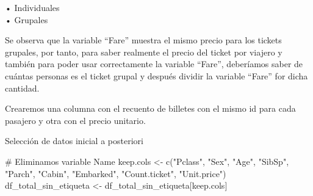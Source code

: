 \documentclass[
]{article}
\newenvironment{Shaded}{\begin{snugshade}}{\end{snugshade}}
\newcommand{\CommentTok}[1]{\textcolor[rgb]{0.50,0.62,0.50}{#1}}
\newcommand{\DataTypeTok}[1]{\textcolor[rgb]{0.87,0.87,0.75}{#1}}
\newcommand{\KeywordTok}[1]{\textcolor[rgb]{0.94,0.87,0.69}{#1}}
\newcommand{\NormalTok}[1]{\textcolor[rgb]{0.80,0.80,0.80}{#1}}
\newcommand{\OperatorTok}[1]{\textcolor[rgb]{0.94,0.94,0.82}{#1}}
\newcommand{\StringTok}[1]{\textcolor[rgb]{0.80,0.58,0.58}{#1}}
\begin{document}
• Individuales\\
• Grupales

Se observa que la variable ``Fare'' muestra el mismo precio para los
tickets grupales, por tanto, para saber realmente el precio del ticket
por viajero y también para poder usar correctamente la variable
``Fare'', deberíamos saber de cuántas personas es el ticket grupal y
después dividir la variable ``Fare'' for dicha cantidad.

Crearemos una columna con el recuento de billetes con el mismo id para
cada pasajero y otra con el precio unitario.

\begin{Shaded}
\end{Shaded}

\begin{Shaded}
\end{Shaded}

Selección de datos inicial a posteriori

\begin{Shaded}
\begin{Highlighting}[]
\CommentTok{# Eliminamos variable Name}
\NormalTok{keep.cols <-}\StringTok{ }\KeywordTok{c}\NormalTok{(}\StringTok{"Pclass"}\NormalTok{, }\StringTok{"Sex"}\NormalTok{, }\StringTok{"Age"}\NormalTok{, }\StringTok{"SibSp"}\NormalTok{, }\StringTok{"Parch"}\NormalTok{, }\StringTok{"Cabin"}\NormalTok{, }\StringTok{"Embarked"}\NormalTok{, }\StringTok{"Count.ticket"}\NormalTok{, }\StringTok{"Unit.price"}\NormalTok{)}
\NormalTok{df_total_sin_etiqueta <-}\StringTok{ }\NormalTok{df_total_sin_etiqueta[keep.cols]}
\end{Highlighting}
\end{Shaded}
\end{document}
